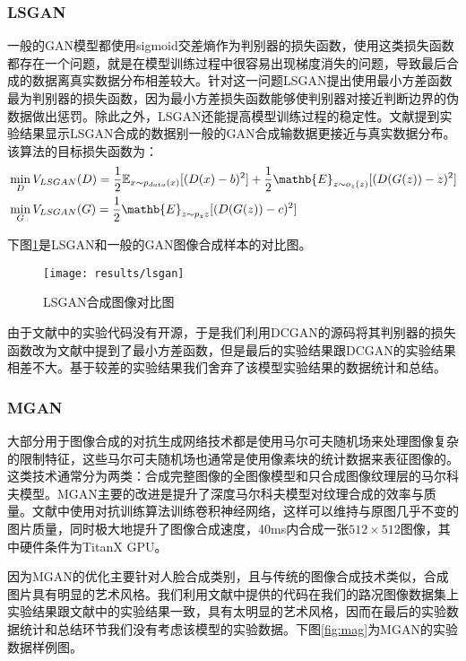 \subsubsection{LSGAN}

 一般的GAN模型都使用sigmoid交差熵作为判别器的损失函数，使用这类损失函数都存在一个问题，就是在模型训练过程中很容易出现梯度消失的问题，导致最后合成的数据离真实数据分布相差较大。针对这一问题LSGAN提出使用最小方差函数最为判别器的损失函数，因为最小方差损失函数能够使判别器对接近判断边界的伪数据做出惩罚。除此之外，LSGAN还能提高模型训练过程的稳定性。文献\cite{LSGAN}提到实验结果显示LSGAN合成的数据别一般的GAN合成输数据更接近与真实数据分布。该算法的目标损失函数为：
\begin{equation}
\begin{aligned}
    & \min_D V_{LSGAN}(D)=\frac{1}{2}\mathbb{E}_{x\sim p_{data}(x)}[(D(x)-b)^2]+\frac{1}{2}\mathb{E}_{z\sim o_z(z)}[(D(G(z))-z)^2] \\
    & \min_G V_{LSGAN}(G)=\frac{1}{2}\mathb{E}_{z\sim p_z{z}}[(D(G(z))-c)^2]
\end{aligned}
\end{equation}

下图\ref{fig:lsgan}是LSGAN和一般的GAN图像合成样本的对比图。

\begin{figure}[h]
    \centering
    \texttt{[image: results/lsgan]}
    \caption{LSGAN合成图像对比图}
    \label{fig:lsgan}
\end{figure}

由于文献中的实验代码没有开源，于是我们利用DCGAN的源码将其判别器的损失函数改为文献中提到了最小方差函数，但是最后的实验结果跟DCGAN的实验结果相差不大。基于较差的实验结果我们舍弃了该模型实验结果的数据统计和总结。

\subsubsection{MGAN}

 大部分用于图像合成的对抗生成网络技术都是使用马尔可夫随机场来处理图像复杂的限制特征，这些马尔可夫随机场也通常是使用像素块的统计数据来表征图像的。这类技术通常分为两类：合成完整图像的全图像模型和只合成图像纹理层的马尔科夫模型。MGAN主要的改进是提升了深度马尔科夫模型对纹理合成的效率与质量。文献\cite{MGAN}中使用对抗训练\cite{adtrain}算法训练卷积神经网络，这样可以维持与原图几乎不变的图片质量，同时极大地提升了图像合成速度，40ms内合成一张$512\times 512$图像，其中硬件条件为TitanX GPU。

因为MGAN的优化主要针对人脸合成类别，且与传统的图像合成技术类似，合成图片具有明显的艺术风格。我们利用文献中提供的代码\cite{git:mgan}在我们的路况图像数据集上实验结果跟文献中的实验结果一致，具有太明显的艺术风格，因而在最后的实验数据统计和总结环节我们没有考虑该模型的实验数据。下图\ref{fig:mag}为MGAN的实验数据样例图。

